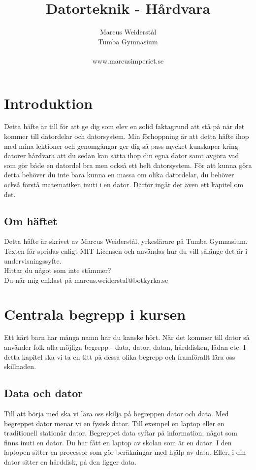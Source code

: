 \documentclass[12pt, letterpaper]{report}
\title{Datorteknik - Hårdvara}
\author{Marcus Weiderstål \\ Tumba Gymnasium \\ \\ www.marcusimperiet.se}
\date{}
\begin{document}
\begin{titlepage}
\maketitle
\end{titlepage}

\tableofcontents{}
\chapter{Introduktion}
Detta häfte är till för att ge dig som elev en solid faktagrund att stå på när det kommer till datordelar och datorsystem. Min förhoppning är att detta häfte ihop med mina lektioner och genomgångar ger dig så pass mycket kunskaper kring datorer hårdvara att du sedan kan sätta ihop din egna dator samt avgöra vad som gör både en datordel bra men också ett helt datorsystem. För att kunna göra detta behöver du inte bara kunna en massa om olika datordelar, du behöver också förstå matematiken inuti i en dator. Därför ingår det även ett kapitel om det.

\section{Om häftet}
Detta häfte är skrivet av Marcus Weiderstål, yrkeslärare på Tumba Gymnasium. Texten får spridas enligt MIT Licensen och användas hur du vill sålänge det är i undervisningssyfte.\\Hittar du något som inte stämmer?\\ Du når mig enklast på  marcus.weiderstal@botkyrka.se
\newpage 

\chapter{Centrala begrepp i kursen}
Ett kärt barn har många namn har du kanske hört. När det kommer till dator så använder folk alla möjliga begrepp - data, dator, datan, hårddisken, lådan etc. I detta kapitel ska vi ta en titt på dessa olika begrepp och framförallt lära oss skillnaden.

\section{Data och dator}
Till att börja med ska vi lära oss skilja på begreppen dator och data. Med begreppet dator menar vi en fysisk dator. Till exempel en laptop eller en traditionell stationär dator. Begreppet data syftar på information, något som finns inuti en dator. Du har fått en laptop av skolan som är en dator. I den laptopen sitter en processor som gör beräkningar med hjälp av data. Eller, i din dator sitter en hårddisk, på den ligger data. 
\end{document}
